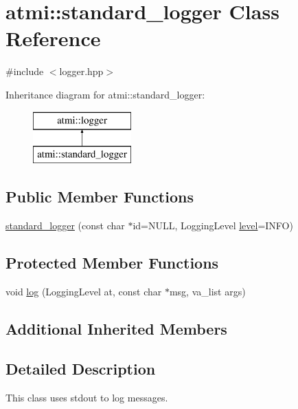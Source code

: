 \hypertarget{classatmi_1_1standard__logger}{\section{atmi\+:\+:standard\+\_\+logger Class Reference}
\label{classatmi_1_1standard__logger}
}


{\ttfamily \#include $<$logger.\+hpp$>$}

Inheritance diagram for atmi\+:\+:standard\+\_\+logger\+:\begin{figure}[H]
\begin{center}
\leavevmode
\includegraphics[height=2.000000cm]{classatmi_1_1standard__logger}
\end{center}
\end{figure}
\subsection*{Public Member Functions}
\begin{DoxyCompactItemize}
\item 
\hyperlink{classatmi_1_1standard__logger_a1f1d082ae9c3aa8eb63ea0911b31af81}{standard\+\_\+logger} (const char $\ast$id=N\+U\+L\+L, Logging\+Level \hyperlink{classatmi_1_1logger_a70bf3a05b911b63d4548507fdea5dfbd}{level}=I\+N\+F\+O)
\end{DoxyCompactItemize}
\subsection*{Protected Member Functions}
\begin{DoxyCompactItemize}
\item 
void \hyperlink{classatmi_1_1standard__logger_ab3e14ab83476e546a0cb27803d787092}{log} (Logging\+Level at, const char $\ast$msg, va\+\_\+list args)
\end{DoxyCompactItemize}
\subsection*{Additional Inherited Members}


\subsection{Detailed Description}
This class uses stdout to log messages.

